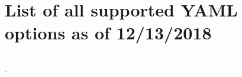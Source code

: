 \documentclass[10pt,oneside]{report}
\begin{document}
\section{List of all supported YAML options as of 12/13/2018}
\inputminted[]{yaml}{alloptions-2018-12-13.yaml}.


\end{document}
